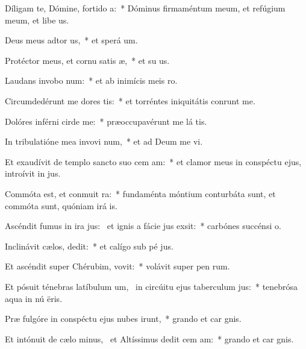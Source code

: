 \item Díligam te, Dómine, fortido a:~* Dóminus firmaméntum meum, et refúgium meum, et libe us.
\item Deus meus adtor us,~* et sperá  um.
\item Protéctor meus, et cornu satis æ,~* et su us.
\item Laudans invobo num:~* et ab inimícis meis  ro.
\item Circumdedérunt me dores tis:~* et torréntes iniquitátis conrunt me.
\item Dolóres inférni cirde me:~* præoccupavérunt me lá tis.
\item In tribulatióne mea invovi num,~* et ad Deum me vi.
\item Et exaudívit de templo sancto suo cem am:~* et clamor meus in conspéctu ejus, introívit in  jus.
\item Commóta est, et conmuit ra:~* fundaménta móntium conturbáta sunt, et commóta sunt, quóniam irá  is.
\item Ascéndit fumus in ira jus:~\pscross{} et ignis a fácie jus exsit:~* carbónes succénsi   o.
\item Inclinávit cælos,  dedit:~* et calígo sub pé jus.
\item Et ascéndit super Chérubim,  vovit:~* volávit super pen rum.
\item Et pósuit ténebras latíbulum um,~\pscross{} in circúitu ejus taberculum jus:~* tenebrósa aqua in nú ëris.
\item Præ fulgóre in conspéctu ejus nubes irunt,~* grando et car gnis.
\item Et intónuit de cælo minus,~\pscross{} et Altíssimus dedit cem am:~* grando et car gnis.
